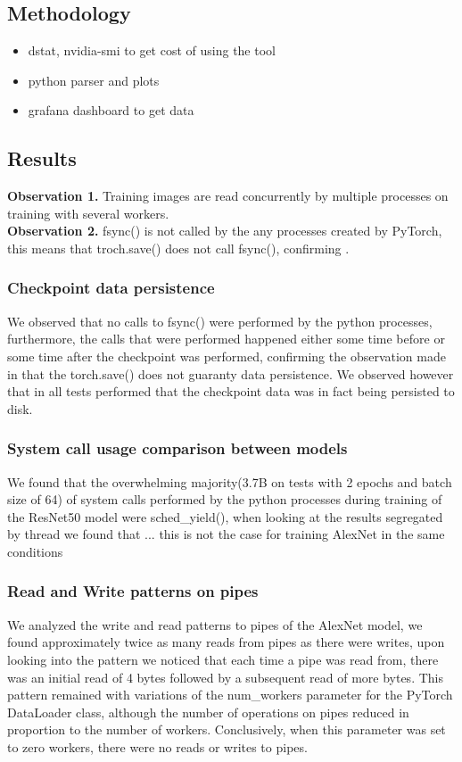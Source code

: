 \documentclass[conference]{IEEEtran}
\begin{document}
\subsection{Methodology}

\begin{itemize}
	\item dstat, nvidia-smi to get cost of using the tool
	\item python parser and plots
	\item grafana dashboard to get data
\end{itemize}



\subsection{Results}
\textbf{Observation 1.} Training images are read concurrently by multiple processes on training with several workers.
\\
\textbf{Observation 2.} fsync() is not called by the any processes created by PyTorch, this means that troch.save() does not call fsync(), confirming \cite{checkfreq}.

\subsubsection{Checkpoint data persistence}
We observed that no calls to fsync() were performed by the python processes, furthermore, the calls that were performed happened either some time before or some time after the checkpoint was performed, confirming the observation made in \cite{checkfreq} that the torch.save() does not guaranty data persistence.
We observed however that in all tests performed that the checkpoint data was in fact being persisted to disk.

\subsubsection{System call usage comparison between models}
We found that the overwhelming majority(3.7B on tests with 2 epochs and batch size of 64) of system calls performed by the python processes during training of the ResNet50 model were sched\_yield(), when looking at the results segregated by thread we found that ... this is not the case for training AlexNet in the same conditions

\subsubsection{Read and Write patterns on pipes}
We analyzed the write and read patterns to pipes of the AlexNet model, we found approximately twice as many reads from pipes as there were writes, upon looking into the pattern we noticed that
each time a pipe was read from, there was an initial read of 4 bytes followed by a subsequent read of more bytes.
This pattern remained with variations of the num\_workers parameter for the PyTorch DataLoader class, although the number of operations on pipes reduced in proportion to the number of workers. Conclusively, when this parameter was set to zero workers, there were no reads or writes to pipes.
\end{document}
